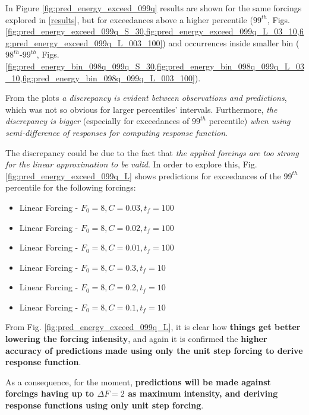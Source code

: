 \documentclass{article}
\begin{document}
In Figure \ref{fig:pred_energy_exceed_099q} results are shown for the same forcings explored in \ref{results}, but for exceedances above a higher percentile ($99^{th}$, Figs. \cref{fig:pred_energy_exceed_099q_S_30,fig:pred_energy_exceed_099q_L_03_10,fig:pred_energy_exceed_099q_L_003_100}) and occurrences inside smaller bin ($98^{th}$-$99^{th}$, Figs. \cref{fig:pred_energy_bin_098q_099q_S_30,fig:pred_energy_bin_098q_099q_L_03_10,fig:pred_energy_bin_098q_099q_L_003_100}). 

From the plots \textit{a discrepancy is evident between observations and predictions}, which was not so obvious for larger percentiles' intervals. Furthermore, \textit{the discrepancy is bigger} (especially for exceedances of $99^{th}$ percentile) \textit{when using semi-difference of responses for computing response function}.

The discrepancy could be due to the fact that \textit{the applied forcings are too strong for the linear approximation to be valid}. In order to explore this, Fig. \ref{fig:pred_energy_exceed_099q_L} shows predictions for exceedances of the $99^{th}$ percentile for the following forcings:

\begin{itemize}
	\item Linear Forcing - $F_0=8, C=0.03, t_f=100$
	\item Linear Forcing - $F_0=8, C=0.02, t_f=100$
	\item Linear Forcing - $F_0=8, C=0.01, t_f=100$
	\item Linear Forcing - $F_0=8, C=0.3, t_f=10$
	\item Linear Forcing - $F_0=8, C=0.2, t_f=10$
	\item Linear Forcing - $F_0=8, C=0.1, t_f=10$
\end{itemize}

From Fig. \ref{fig:pred_energy_exceed_099q_L}, it is clear how \textbf{things get better lowering the forcing intensity}, and again it is confirmed the \textbf{higher accuracy of predictions made using only the unit step forcing to derive response function}.

As a consequence, for the moment, \textbf{predictions will be made against forcings having up to $\Delta F=2$ as maximum intensity, and deriving response functions using only unit step forcing}. 
\end{document}
